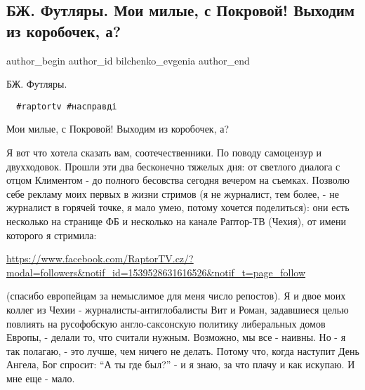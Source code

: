  
 
 
 
 
 
\subsection{БЖ. Футляры. Мои милые, с Покровой! Выходим из коробочек, а?}
\label{sec:15_10_2018.fb.bilchenko_evgenia.1.pokrova_futljary}
\ifcmt
 author_begin
   author_id bilchenko_evgenia
 author_end
\fi

БЖ. Футляры.

\begin{verbatim}
  #raptortv #насправді
\end{verbatim}

Мои милые, с Покровой! Выходим из коробочек, а?

Я вот что хотела сказать вам, соотечественники. По поводу  самоцензур и
двухходовок. Прошли эти два бесконечно тяжелых дня: от светлого диалога с отцом
Климентом - до полного бесовства сегодня вечером на съемках. Позволю себе
рекламу моих первых в жизни стримов (я не журналист, тем более, - не журналист
в горячей точке, я мало умею, потому хочется поделиться): они есть несколько на
странице ФБ и несколько на канале Раптор-ТВ (Чехия), от имени которого я
стримила:

\url{https://www.facebook.com/RaptorTV.cz/?modal=followers&notif_id=1539528631616526&notif_t=page_follow}

(спасибо европейцам за немыслимое для меня число репостов). Я и двое моих
коллег из Чехии - журналисты-антиглобалисты Вит и Роман, задавшиеся целью
повлиять на русофобскую англо-саксонскую политику либеральных домов Европы, -
делали то, что считали нужным. Возможно, мы все - наивны. Но - я так полагаю, -
это лучше, чем ничего не делать. Потому что, когда наступит День Ангела, Бог
спросит: \enquote{А ты где был?} - и я знаю, за что плачу и как искупаю. И мне еще -
мало.

